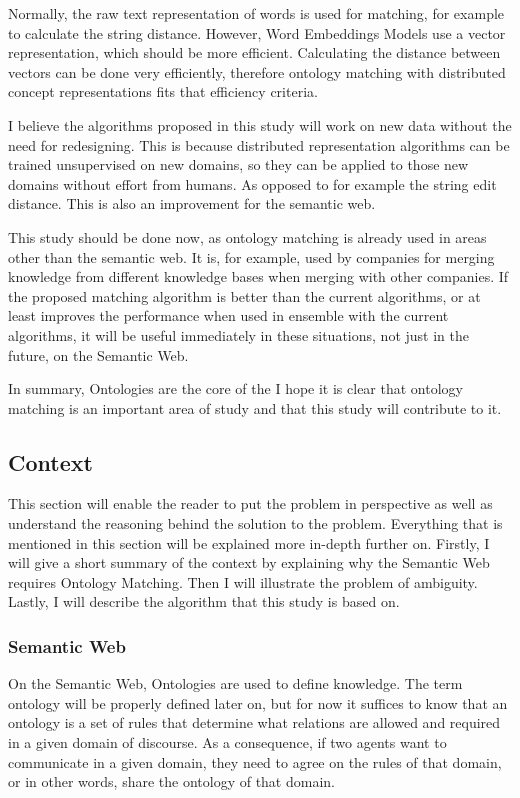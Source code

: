 \documentclass{article}
\begin{document}
 Normally, the raw text representation of words is used for matching, for example to calculate the string distance. However, Word Embeddings Models use a vector representation, which should be more efficient.
 Calculating the distance between vectors can be done very efficiently, therefore ontology matching with distributed concept representations fits that efficiency criteria. 
 
 I believe the algorithms proposed in this study will work on new data without the need for redesigning. This is because distributed representation algorithms can be trained unsupervised on new domains, so they can be applied to those new domains without effort from humans. As opposed to for example the string edit distance. This is also an improvement for the semantic web.
 
 This study should be done now, as ontology matching is already used in areas other than the semantic web. It is, for example, used by companies for merging knowledge from different knowledge bases when merging with other companies. If the proposed matching algorithm is better than the current algorithms, or at least improves the performance when used in ensemble with the current algorithms, it will be useful immediately in these situations, not just in the future, on the Semantic Web.
 
 In summary, Ontologies are the core of the I hope it is clear that ontology matching is an important area of study and that this study will contribute to it.

 \subsection{Context}
 This section will enable the reader to put the problem in perspective as well as understand the reasoning behind the solution to the problem. Everything that is mentioned in this section will be explained more in-depth further on.
 Firstly, I will give a short summary of the context by explaining why the Semantic Web requires Ontology Matching. Then I will illustrate the problem of ambiguity. Lastly, I will describe the algorithm that this study is based on.

 \subsubsection{Semantic Web}
 On the Semantic Web, Ontologies are used to define knowledge\cite{fensel2001ontologies}.
 The term ontology will be properly defined later on, but for now it suffices to know that an ontology is a set of rules that determine what relations are allowed and required in a given domain of discourse. As a consequence, if two agents want to communicate in a given domain, they need to agree on the rules of that domain, or in other words, share the ontology of that domain.
 
\end{document}
